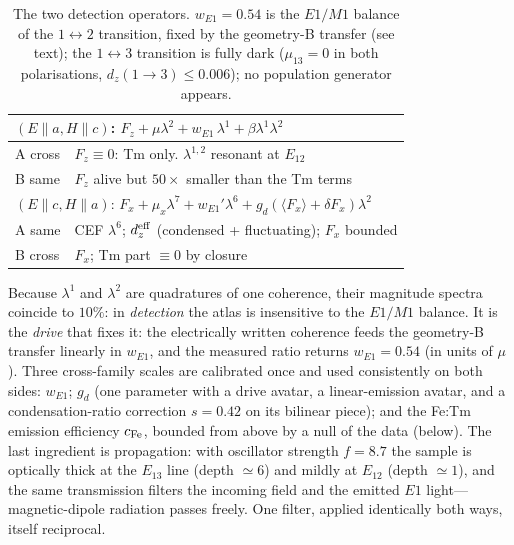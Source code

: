 \documentclass[aps,prb,twocolumn,superscriptaddress,longbibliography]{revtex4-2}
\begin{document}
\begin{table}[b]
\caption{The two detection operators.  $w_{E1}=0.54$ is the $E1/M1$
balance of the $1\!\leftrightarrow\!2$ transition, fixed by the
geometry-B transfer (see text); the $1\!\leftrightarrow\!3$
transition is fully dark ($\mu_{13}=0$ in both polarisations,
$d_z(1{\to}3)\leq0.006$); no population generator appears.}
\label{tab:channels}
\centering\small
\renewcommand{\arraystretch}{1.3}
\begin{tabular}{ll}
\hline
\multicolumn{2}{l}{$(E\!\parallel\!a,H\!\parallel\!c)$:\quad
  $F_z+\mu\lambda^2
   +w_{E1}\,\lambda^1
   +\beta\lambda^1\lambda^2$}\\
\hline
A cross & $F_z\equiv0$: Tm only.  $\lambda^{1,2}$ resonant at $E_{12}$\\
B same & $F_z$ alive but $50\times$ smaller than the Tm terms\\
\hline
\multicolumn{2}{l}{$(E\!\parallel\!c,H\!\parallel\!a)$:\quad
  $F_x+\mu_{x}\lambda^7
   +w_{E1}'\lambda^6
   +g_d(\langle F_x\rangle{+}\delta F_x)\lambda^2$}\\
\hline
A same & CEF $\lambda^{6}$; $d_z^{\rm eff}$ (condensed + fluctuating);
  $F_x$ bounded\\
B cross & $F_x$; Tm part $\equiv0$ by closure\\
\hline
\end{tabular}
\end{table}

Because $\lambda^1$ and $\lambda^2$ are quadratures of one coherence,
their magnitude spectra coincide to $10\%$: in \emph{detection} the
atlas is insensitive to the $E1/M1$ balance.  It is the \emph{drive}
that fixes it: the electrically written coherence feeds the
geometry-B transfer linearly in $w_{E1}$, and the measured ratio
returns $w_{E1}=0.54$ (in units of $\mu$).  Three cross-family scales
are calibrated once and used consistently on both sides: $w_{E1}$;
$g_d$ (one parameter with a drive avatar, a linear-emission avatar,
and a condensation-ratio correction $s=0.42$ on its bilinear piece);
and the Fe:Tm emission efficiency $c_{\rm Fe}$, bounded from above by
a null of the data (below).  The last ingredient is propagation: with
oscillator strength $f=8.7$ the sample is optically thick at the
$E_{13}$ line (depth $\simeq6$) and mildly at $E_{12}$ (depth
$\simeq1$), and the same transmission filters the incoming field and
the emitted $E1$ light---magnetic-dipole radiation passes freely.
One filter, applied identically both ways, itself reciprocal.
\end{document}
